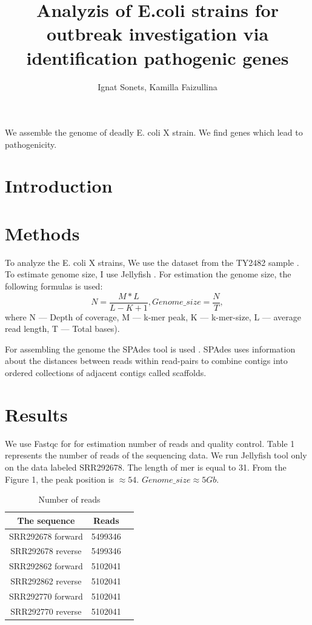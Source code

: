 \documentclass{article}
\title{ Analyzis of E.coli strains for outbreak investigation via identification pathogenic genes    }
\author{ Ignat Sonets, Kamilla Faizullina}
\date{\empty}
\begin{document}
\maketitle
We assemble the genome of deadly E. coli X strain. We find genes which lead to pathogenicity.
 
 
\section{Introduction}
\section{Methods}
To analyze the E. coli X strains, We use the dataset from the TY2482 sample \cite{data}. To estimate genome size, I use Jellyfish \cite{jellyfish}. For estimation the genome size, the following formulas is used: 
$$ N = \frac{M*L}{L-K+1}, Genome\_size = \frac{N}{T}, $$
where N --- Depth of coverage, M --- k-mer peak, K --- k-mer-size, L --- average read length, T --- Total bases).

For assembling the genome the SPAdes tool is used \cite {spades}. SPAdes uses information about the distances between reads within read-pairs to combine contigs into ordered collections of adjacent contigs called scaffolds. 

 


\section{Results}
We use Fastqc for \cite{fc} for estimation number of reads and quality control. Table 1 represents the number of reads of the sequencing data.  
We run Jellyfish tool only on the data labeled SRR292678. The length of mer is equal to 31. From the Figure 1, the peak position is $\approx 54$. $Genome\_size \approx 5 Gb$. %
	\begin{table} 
	\centering
	\begin{tabular}{|c|c|c|}
		\hline
		The sequence & Reads \\
		\hline
		SRR292678 forward  &  5499346  \\
		\hline
		SRR292678 reverse &  5499346 \\
		\hline
		SRR292862 forward &  5102041 \\
		\hline
		SRR292862 reverse &  5102041 \\
		\hline
		SRR292770 forward  &  5102041 \\
		\hline
		SRR292770 reverse &   5102041  \\
		\hline
	\end{tabular}
	\caption{  Number of reads }
\end{table}
\end{document}
